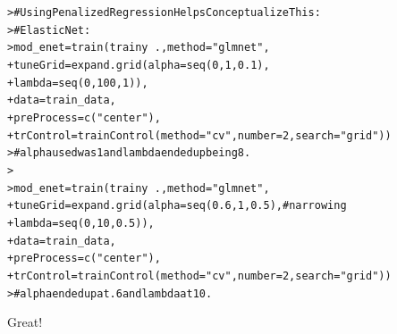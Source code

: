 \documentclass[12pt]{article}\usepackage[]{graphicx}\usepackage[]{color}
\makeatletter
\newcommand{\hlnum}[1]{\textcolor[rgb]{0.82,0.78,0.62}{#1}}%
\newcommand{\hlstr}[1]{\textcolor[rgb]{0.82,0.78,0.62}{#1}}%
\newcommand{\hlcom}[1]{\textcolor[rgb]{0.404,0.408,0.42}{#1}}%
\newcommand{\hlopt}[1]{\textcolor[rgb]{0.882,0.878,0.898}{#1}}%
\newcommand{\hlstd}[1]{\textcolor[rgb]{0.882,0.878,0.898}{#1}}%
\newcommand{\hlkwb}[1]{\textcolor[rgb]{0.902,0.675,0.196}{#1}}%
\newcommand{\hlkwc}[1]{\textcolor[rgb]{0.812,0.522,0.388}{#1}}%
\newcommand{\hlkwd}[1]{\textcolor[rgb]{0.733,0.388,0.812}{#1}}%
\newenvironment{kframe}{%
 \def\at@end@of@kframe{}%
 \ifinner\ifhmode%
  \def\at@end@of@kframe{\end{minipage}}%
  \begin{minipage}{\columnwidth}%
 \fi\fi%
 \def\FrameCommand##1{\hskip\@totalleftmargin \hskip-\fboxsep
 \colorbox{shadecolor}{##1}\hskip-\fboxsep
     \hskip-\linewidth \hskip-\@totalleftmargin \hskip\columnwidth}%
 \MakeFramed {\advance\hsize-\width
   \@totalleftmargin\z@ \linewidth\hsize
   \@setminipage}}%
 {\par\unskip\endMakeFramed%
 \at@end@of@kframe}
\newenvironment{knitrout}{}{} %
\makeatother
\begin{document}
\begin{flushleft}
\begin{knitrout}
\color{fgcolor}\begin{kframe}
\begin{alltt}
\hlstd{> }\hlcom{# Using Penalized Regression Helps Conceptualize This:}
\hlstd{> }\hlcom{# Elastic Net:}
\hlstd{> }\hlstd{mod_enet} \hlkwb{=} \hlkwd{train}\hlstd{(trainy}\hlopt{~}\hlstd{.,} \hlkwc{method} \hlstd{=} \hlstr{"glmnet"}\hlstd{,}
\hlstd{+ }          \hlkwc{tuneGrid} \hlstd{=} \hlkwd{expand.grid}\hlstd{(}\hlkwc{alpha} \hlstd{=} \hlkwd{seq}\hlstd{(}\hlnum{0}\hlstd{,}\hlnum{1}\hlstd{,}\hlnum{0.1}\hlstd{),}
\hlstd{+ }                                \hlkwc{lambda} \hlstd{=} \hlkwd{seq}\hlstd{(}\hlnum{0}\hlstd{,}\hlnum{100}\hlstd{,}\hlnum{1}\hlstd{)),}
\hlstd{+ }          \hlkwc{data} \hlstd{= train_data,}
\hlstd{+ }          \hlkwc{preProcess} \hlstd{=} \hlkwd{c}\hlstd{(}\hlstr{"center"}\hlstd{),}
\hlstd{+ }          \hlkwc{trControl} \hlstd{=} \hlkwd{trainControl}\hlstd{(}\hlkwc{method}\hlstd{=}\hlstr{"cv"}\hlstd{,}\hlkwc{number}\hlstd{=}\hlnum{2}\hlstd{,} \hlkwc{search}\hlstd{=}\hlstr{"grid"}\hlstd{))}
\hlstd{> }\hlcom{# alpha used was 1 and lambda ended up being 8.}
\hlstd{> }
\hlstd{> }\hlstd{mod_enet} \hlkwb{=} \hlkwd{train}\hlstd{(trainy}\hlopt{~}\hlstd{.,} \hlkwc{method} \hlstd{=} \hlstr{"glmnet"}\hlstd{,}
\hlstd{+ }          \hlkwc{tuneGrid}\hlstd{=}\hlkwd{expand.grid}\hlstd{(}\hlkwc{alpha} \hlstd{=} \hlkwd{seq}\hlstd{(}\hlnum{0.6}\hlstd{,}\hlnum{1}\hlstd{,}\hlnum{0.5}\hlstd{),} \hlcom{#narrowing}
\hlstd{+ }                              \hlkwc{lambda} \hlstd{=} \hlkwd{seq}\hlstd{(}\hlnum{0}\hlstd{,}\hlnum{10}\hlstd{,}\hlnum{0.5}\hlstd{)),}
\hlstd{+ }          \hlkwc{data} \hlstd{= train_data,}
\hlstd{+ }          \hlkwc{preProcess} \hlstd{=} \hlkwd{c}\hlstd{(}\hlstr{"center"}\hlstd{),}
\hlstd{+ }          \hlkwc{trControl} \hlstd{=} \hlkwd{trainControl}\hlstd{(}\hlkwc{method}\hlstd{=}\hlstr{"cv"}\hlstd{,}\hlkwc{number}\hlstd{=}\hlnum{2}\hlstd{,} \hlkwc{search}\hlstd{=}\hlstr{"grid"}\hlstd{))}
\hlstd{> }\hlcom{# alpha ended up at .6 and lambda at 10.}
\end{alltt}
\end{kframe}
\end{knitrout}

Great!


\end{flushleft}
\end{document}
